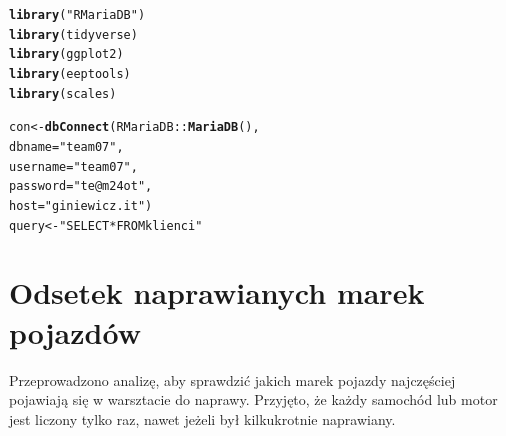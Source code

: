 \documentclass{article}\usepackage[]{graphicx}\usepackage[]{xcolor}
\makeatletter
\newcommand{\hlstr}[1]{\textcolor[rgb]{0.192,0.494,0.8}{#1}}%
\newcommand{\hlopt}[1]{\textcolor[rgb]{0,0,0}{#1}}%
\newcommand{\hlstd}[1]{\textcolor[rgb]{0.345,0.345,0.345}{#1}}%
\newcommand{\hlkwb}[1]{\textcolor[rgb]{0.69,0.353,0.396}{#1}}%
\newcommand{\hlkwc}[1]{\textcolor[rgb]{0.333,0.667,0.333}{#1}}%
\newcommand{\hlkwd}[1]{\textcolor[rgb]{0.737,0.353,0.396}{\textbf{#1}}}%
\newenvironment{kframe}{%
 \def\at@end@of@kframe{}%
 \ifinner\ifhmode%
  \def\at@end@of@kframe{\end{minipage}}%
  \begin{minipage}{\columnwidth}%
 \fi\fi%
 \def\FrameCommand##1{\hskip\@totalleftmargin \hskip-\fboxsep
 \colorbox{shadecolor}{##1}\hskip-\fboxsep
     \hskip-\linewidth \hskip-\@totalleftmargin \hskip\columnwidth}%
 \MakeFramed {\advance\hsize-\width
   \@totalleftmargin\z@ \linewidth\hsize
   \@setminipage}}%
 {\par\unskip\endMakeFramed%
 \at@end@of@kframe}
\newenvironment{knitrout}{}{} %
\makeatother
\begin{document}
\begin{knitrout}
\color{fgcolor}\begin{kframe}
\begin{alltt}
\hlkwd{library}\hlstd{(}\hlstr{"RMariaDB"}\hlstd{)}
\hlkwd{library}\hlstd{(tidyverse)}
\hlkwd{library}\hlstd{(ggplot2)}
\hlkwd{library}\hlstd{(eeptools)}
\hlkwd{library}\hlstd{(scales)}

\hlstd{con} \hlkwb{<-} \hlkwd{dbConnect}\hlstd{(RMariaDB}\hlopt{::}\hlkwd{MariaDB}\hlstd{(),}
                 \hlkwc{dbname} \hlstd{=} \hlstr{"team07"}\hlstd{,}
                 \hlkwc{username} \hlstd{=} \hlstr{"team07"}\hlstd{,}
                 \hlkwc{password} \hlstd{=} \hlstr{"te@m24ot"}\hlstd{,}
                 \hlkwc{host} \hlstd{=} \hlstr{"giniewicz.it"}\hlstd{)}
\hlstd{query} \hlkwb{<-} \hlstr{"SELECT * FROM klienci"}
\end{alltt}
\end{kframe}
\end{knitrout}

\section{Odsetek naprawianych marek pojazdów}

Przeprowadzono analizę, aby sprawdzić jakich marek pojazdy najczęściej pojawiają się w warsztacie do naprawy. Przyjęto, że każdy samochód lub motor jest liczony tylko raz, nawet jeżeli był kilkukrotnie naprawiany.
\end{document}
